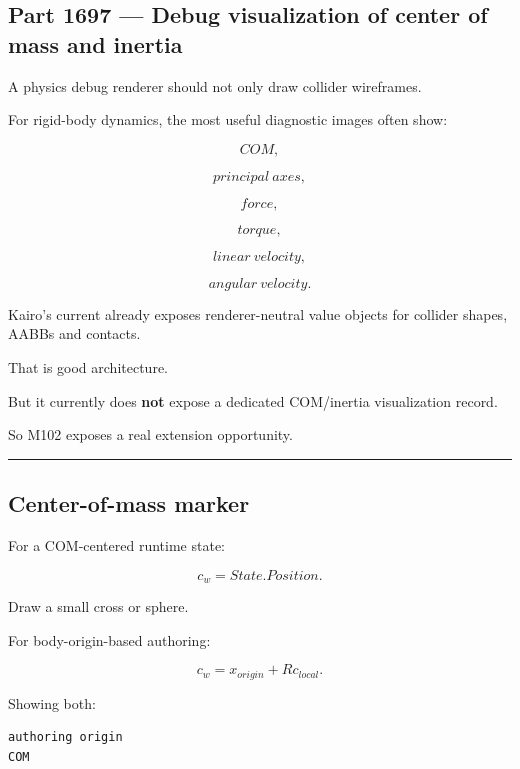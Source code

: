 \subsection{Part 1697 --- Debug visualization of center of mass and inertia}\label{06-engine-ii-ch039-part-1697-debug-visualization-of-center-of-mass-and-inertia}

\hypertarget{06-engine-ii-ch039-part-1697-debug-visualization-of-center-of-mass-and-inertia}{}

A physics debug renderer should not only draw collider wireframes.

For rigid-body dynamics, the most useful diagnostic images often show:

\[
COM,
\]

\[
principal\ axes,
\]

\[
force,
\]

\[
torque,
\]

\[
linear\ velocity,
\]

\[
angular\ velocity.
\]

Kairo's current  already exposes renderer-neutral value objects for collider shapes, AABBs and contacts.

That is good architecture.

But it currently does \textbf{not} expose a dedicated COM/inertia visualization record.

So M102 exposes a real extension opportunity.

\begin{center}\rule{0.5\linewidth}{0.5pt}\end{center}

\subsection{Center-of-mass marker}\label{06-engine-ii-ch039-center-of-mass-marker}

\hypertarget{06-engine-ii-ch039-center-of-mass-marker}{}

For a COM-centered runtime state:

\[
c_w=
State.Position.
\]

Draw a small cross or sphere.

For body-origin-based authoring:

\[
c_w
=
x_{origin}
+
R c_{local}.
\]

Showing both:

\begin{verbatim}
authoring origin
COM
\end{verbatim}

